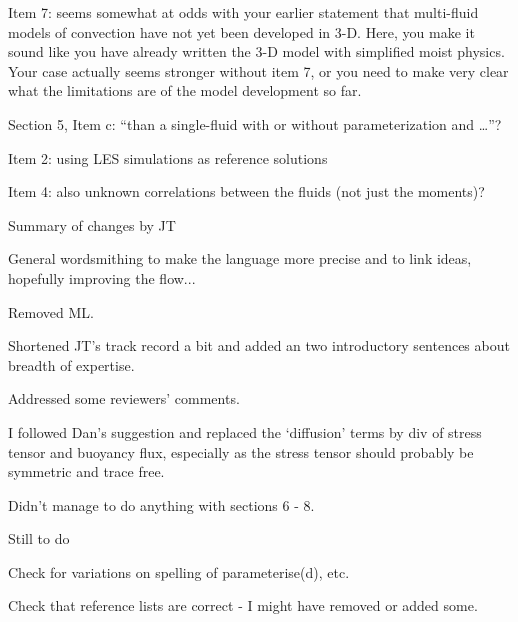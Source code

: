 \documentclass[11pt,a4paper]{article}
\begin{document}
{Item 7: seems somewhat at odds with your earlier statement that multi-fluid models of convection have not yet been developed in 3-D. Here, you make it sound like you have already written the 3-D model with simplified moist physics. Your case actually seems stronger without item 7, or you need to make very clear what the limitations are of the model development so far. 

Section 5, Item c: “than a single-fluid with or without parameterization and …”? 

{\color{blue}
Item 2: using LES simulations as reference solutions }

{\color{blue}
Item 4: also unknown correlations between the fluids (not just the moments)? }
 
 


}

\vspace{10mm}

Summary of changes by JT

General wordsmithing to make the language more precise and to link ideas, hopefully improving the flow...

Removed ML.

Shortened JT's track record a bit and added an two introductory sentences about breadth of expertise.

Addressed some reviewers' comments.

I followed Dan's suggestion and replaced the `diffusion' terms by div of stress tensor and buoyancy flux, especially as the stress tensor should probably be symmetric and trace free.

Didn't manage to do anything with sections 6 - 8.


{\color{red}
Still to do

Check for variations on spelling of parameterise(d), etc.

Check that reference lists are correct - I might have removed or added some.


}
\end{document}
